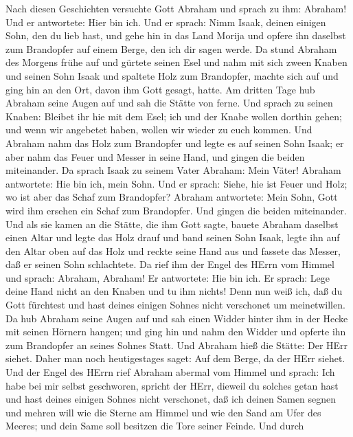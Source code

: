  Nach diesen Geschichten versuchte Gott Abraham und sprach
zu ihm: Abraham! Und er antwortete: Hier bin ich.  Und er
sprach: Nimm Isaak, deinen einigen Sohn, den du lieb hast, und gehe hin
in das Land Morija und opfere ihn daselbst zum Brandopfer auf einem
Berge, den ich dir sagen werde.  Da stund Abraham des
Morgens frühe auf und gürtete seinen Esel und nahm mit sich zween Knaben
und seinen Sohn Isaak und spaltete Holz zum Brandopfer, machte sich auf
und ging hin an den Ort, davon ihm Gott gesagt, hatte.  Am
dritten Tage hub Abraham seine Augen auf und sah die Stätte von ferne.
 Und sprach zu seinen Knaben: Bleibet ihr hie mit dem Esel;
ich und der Knabe wollen dorthin gehen; und wenn wir angebetet haben,
wollen wir wieder zu euch kommen.  Und Abraham nahm das Holz
zum Brandopfer und legte es auf seinen Sohn Isaak; er aber nahm das
Feuer und Messer in seine Hand, und gingen die beiden miteinander.
 Da sprach Isaak zu seinem Vater Abraham: Mein Väter!
Abraham antwortete: Hie bin ich, mein Sohn. Und er sprach: Siehe, hie
ist Feuer und Holz; wo ist aber das Schaf zum Brandopfer? 
Abraham antwortete: Mein Sohn, Gott wird ihm ersehen ein Schaf zum
Brandopfer. Und gingen die beiden miteinander.  Und als sie
kamen an die Stätte, die ihm Gott sagte, bauete Abraham daselbst einen
Altar und legte das Holz drauf und band seinen Sohn Isaak, legte ihn auf
den Altar oben auf das Holz  und reckte seine Hand aus und
fassete das Messer, daß er seinen Sohn schlachtete.  Da
rief ihm der Engel des HErrn vom Himmel und sprach: Abraham, Abraham! Er
antwortete: Hie bin ich.  Er sprach: Lege deine Hand nicht
an den Knaben und tu ihm nichts! Denn nun weiß ich, daß du Gott
fürchtest und hast deines einigen Sohnes nicht verschonet um
meinetwillen.  Da hub Abraham seine Augen auf und sah einen
Widder hinter ihm in der Hecke mit seinen Hörnern hangen; und ging hin
und nahm den Widder und opferte ihn zum Brandopfer an seines Sohnes
Statt.  Und Abraham hieß die Stätte: Der HErr siehet. Daher
man noch heutigestages saget: Auf dem Berge, da der HErr siehet.
 Und der Engel des HErrn rief Abraham abermal vom Himmel
 und sprach: Ich habe bei mir selbst geschworen, spricht
der HErr, dieweil du solches getan hast und hast deines einigen Sohnes
nicht verschonet,  daß ich deinen Samen segnen und mehren
will wie die Sterne am Himmel und wie den Sand am Ufer des Meeres; und
dein Same soll besitzen die Tore seiner Feinde.  Und durch
